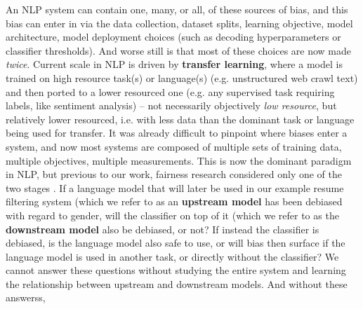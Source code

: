 

An NLP system can contain one, many, or all, of these sources of bias, and this bias can enter in via the data collection, dataset splits, learning objective, model architecture, model deployment choices (such as decoding hyperparameters or classifier thresholds). And worse still is that most of these choices are now made \textit{twice}.  Current scale in NLP is driven by \textbf{transfer learning}, where a model is trained on high resource task(s) or language(s) (e.g. unstructured web crawl text) and then ported to a lower resourced one (e.g. any supervised task requiring labels, like sentiment analysis) -- not necessarily objectively \textit{low resource}, but relatively lower resourced, i.e. with less data than the dominant task or language being used for transfer. 
It was already difficult to pinpoint where biases enter a system, and now most systems are composed of multiple sets of training data, multiple objectives, multiple measurements. This is now the dominant paradigm in NLP, but previous to our work, fairness research considered only one of the two stages . If a language model that will later be used in our example resume filtering system (which we refer to as an \textbf{upstream model} has been debiased with regard to gender, will the classifier on top of it (which we refer to as the \textbf{downstream model} also be debiased, or not? If instead the classifier is debiased, is the language model also safe to use, or will bias then surface if the language model is used in another task, or directly without the classifier? We cannot answer these questions without studying the entire system and learning the relationship between upstream and downstream models. And without these answerss,
